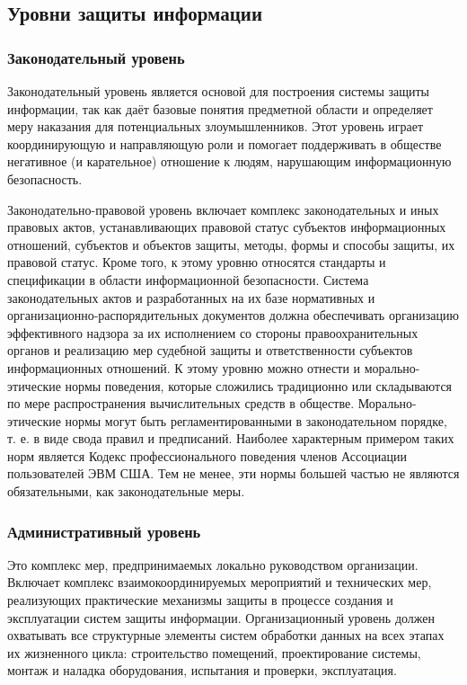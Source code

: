 \subsection{Уровни защиты информации}
\subsubsection{Законодательный уровень}
Законодательный уровень является основой для построения системы защиты
информации, так как даёт базовые понятия предметной области и определяет меру
наказания для потенциальных злоумышленников. Этот уровень играет
координирующую и направляющую роли и помогает поддерживать в обществе
негативное (и карательное) отношение к людям, нарушающим информационную
безопасность.

Законодательно-правовой уровень включает комплекс законодательных и иных
правовых актов, устанавливающих правовой статус субъектов информационных
отношений, субъектов и объектов защиты, методы, формы и способы защиты, их
правовой статус. Кроме того, к этому уровню относятся стандарты и
спецификации в области информационной безопасности. Система законодательных
актов и разработанных на их базе нормативных и
организационно-распорядительных документов должна обеспечивать организацию
эффективного надзора за их исполнением со стороны правоохранительных органов
и реализацию мер судебной защиты и ответственности субъектов информационных
отношений. К этому уровню можно отнести и морально-этические нормы поведения,
которые сложились традиционно или складываются по мере распространения
вычислительных средств в обществе. Морально-этические нормы могут быть
регламентированными в законодательном порядке, т. е. в виде свода правил и
предписаний. Наиболее характерным примером таких норм является Кодекс
профессионального поведения членов Ассоциации пользователей ЭВМ США. Тем не
менее, эти нормы большей частью не являются обязательными, как
законодательные меры.
\subsubsection{Административный уровень}
Это комплекс мер, предпринимаемых локально руководством организации. Включает
комплекс взаимокоординируемых мероприятий и технических мер, реализующих
практические механизмы защиты в процессе создания и эксплуатации систем
защиты информации. Организационный уровень должен охватывать все структурные
элементы систем обработки данных на всех этапах их жизненного цикла:
строительство помещений, проектирование системы, монтаж и наладка
оборудования, испытания и проверки, эксплуатация.

